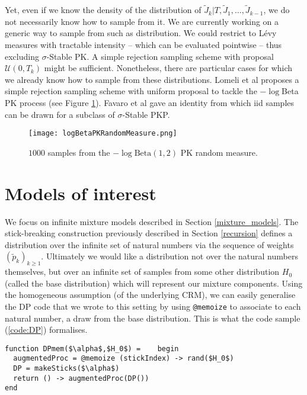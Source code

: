 Yet, even if we know the density of the distribution of $\tilde{J}_{k}|T,\tilde{J}_1,\dots,\tilde{J}_{k-1}$, we do not necessarily know how to sample from it.
We are currently working on a generic way to sample from such as distribution. We could restrict to Lévy measures with tractable intensity -- which can be evaluated pointwise -- thus excluding $\sigma$-Stable \gls{PK}. A simple rejection sampling scheme with proposal $\mathcal{U}(0, T_k)$ might be sufficient.
Nonetheless, there are particular cases for which we already know how to sample from these distributions. Lomeli et al \cite{Lomeli:2015vd} proposes a simple rejection sampling scheme with uniform proposal to tackle the $-\log$Beta \gls{PK} process (see Figure \ref{fig:logBetaPK}). Favaro et al \cite{Favaro:2014bo} gave an identity from which iid samples can be drawn for a subclass of $\sigma$-Stable \gls{PKP}.

\begin{figure}[h!]
\centering
    \texttt{[image: logBetaPKRandomMeasure.png]} 
    \caption{$1000$ samples from the $-\log \text{Beta}(1,2)$ \acrlong{PK} random measure.}
    \label{fig:logBetaPK} 
\end{figure}

\section{Models of interest}
We focus on infinite mixture models described in Section \ref{mixture_models}.
The stick-breaking construction previously described in Section \ref{recursion} defines a distribution over the infinite set of natural numbers via the sequence of weights $(\tilde{p}_k)_{k \ge 1}$. Ultimately we would like a distribution not over the natural numbers themselves, but over an infinite set of samples from some other distribution $H_0$ (called the base distribution) which will represent our mixture components. Using the homogeneous assumption (of the underlying \gls{CRM}), we can easily generalise the \gls{DP} code that we wrote to this setting by using \texttt{@memoize} to associate to each natural number, a draw from the base distribution.
This is what the code sample (\ref{code:DP}) formalises.

\begin{lstlisting}[caption={\acrlong{DP} with base distribution $H_0$ written in Julia.},captionpos=b,label=code:DP]
function DPmem($\alpha$,$H_0$) =    begin
  augmentedProc = @memoize (stickIndex) -> rand($H_0$)
  DP = makeSticks($\alpha$)
  return () -> augmentedProc(DP())
end
\end{lstlisting}

